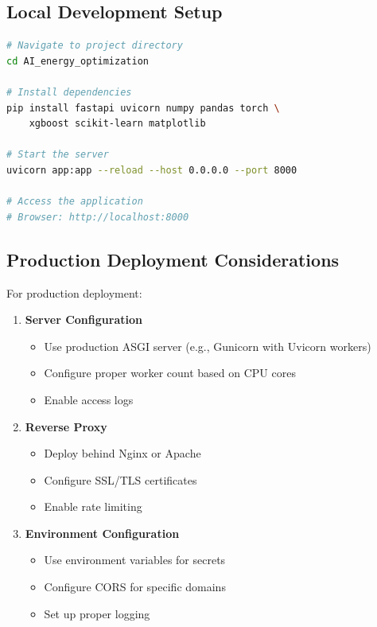 \documentclass[12pt,a4paper]{article}
\begin{document}
\subsection{Local Development Setup}

\begin{lstlisting}[language=bash, caption=Running the application locally]
# Navigate to project directory
cd AI_energy_optimization

# Install dependencies
pip install fastapi uvicorn numpy pandas torch \
    xgboost scikit-learn matplotlib

# Start the server
uvicorn app:app --reload --host 0.0.0.0 --port 8000

# Access the application
# Browser: http://localhost:8000
\end{lstlisting}

\subsection{Production Deployment Considerations}

For production deployment:

\begin{enumerate}[leftmargin=*]
    \item \textbf{Server Configuration}
    \begin{itemize}
        \item Use production ASGI server (e.g., Gunicorn with Uvicorn workers)
        \item Configure proper worker count based on CPU cores
        \item Enable access logs
    \end{itemize}
    
    \item \textbf{Reverse Proxy}
    \begin{itemize}
        \item Deploy behind Nginx or Apache
        \item Configure SSL/TLS certificates
        \item Enable rate limiting
    \end{itemize}
    
    \item \textbf{Environment Configuration}
    \begin{itemize}
        \item Use environment variables for secrets
        \item Configure CORS for specific domains
        \item Set up proper logging
    \end{itemize}
\end{enumerate}
\end{document}
